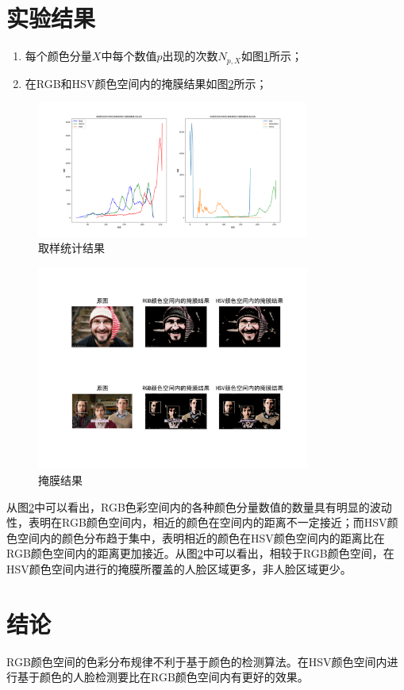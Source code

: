 \documentclass[a4paper]{ctexart}
\begin{document}
\begin{spacing}{1.5}
\section{实验结果}
\begin{enumerate}
	\item 每个颜色分量$X$中每个数值$p$出现的次数$N_{p,X}$如图\ref{reslin}所示；
	\item 在RGB和HSV颜色空间内的掩膜结果如图\ref{respic}所示；
\end{enumerate}
\begin{figure}[htbp]
	\centering
	\includegraphics [width=0.8\textwidth]{figure//res2.png}
	\caption{取样统计结果}\label{reslin}
\end{figure}
\begin{figure}[htbp]
\centering
\includegraphics [width=0.8\textwidth]{figure//res1.png}
\caption{掩膜结果}\label{respic}
\end{figure}
从图\ref{respic}中可以看出，RGB色彩空间内的各种颜色分量数值的数量具有明显的波动性，表明在RGB颜色空间内，相近的颜色在空间内的距离不一定接近；而HSV颜色空间内的颜色分布趋于集中，表明相近的颜色在HSV颜色空间内的距离比在RGB颜色空间内的距离更加接近。从图\ref{respic}中可以看出，相较于RGB颜色空间，在HSV颜色空间内进行的掩膜所覆盖的人脸区域更多，非人脸区域更少。
\section{结论}
RGB颜色空间的色彩分布规律不利于基于颜色的检测算法。在HSV颜色空间内进行基于颜色的人脸检测要比在RGB颜色空间内有更好的效果。
\end{spacing}


\end{document}
